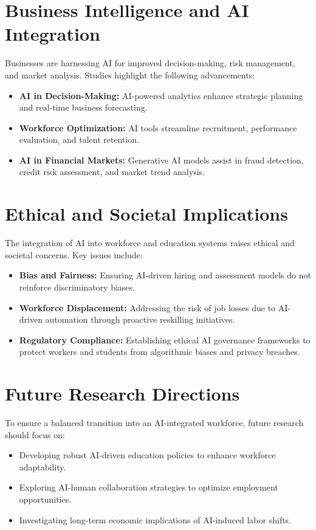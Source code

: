 \documentclass[a4paper,headinclude=on,footinclude=on,12pt,oneside]{scrbook}
\begin{document}
\section*{Business Intelligence and AI Integration}

Businesses are harnessing AI for improved decision-making, risk management, and market analysis. Studies highlight the following advancements:
\begin{itemize}
	\item \textbf{AI in Decision-Making:} AI-powered analytics enhance strategic planning and real-time business forecasting.
	\item \textbf{Workforce Optimization:} AI tools streamline recruitment, performance evaluation, and talent retention.
	\item \textbf{AI in Financial Markets:} Generative AI models assist in fraud detection, credit risk assessment, and market trend analysis.
\end{itemize}

\section{Ethical and Societal Implications}

The integration of AI into workforce and education systems raises ethical and societal concerns. Key issues include:
\begin{itemize}
	\item \textbf{Bias and Fairness:} Ensuring AI-driven hiring and assessment models do not reinforce discriminatory biases.
	\item \textbf{Workforce Displacement:} Addressing the risk of job losses due to AI-driven automation through proactive reskilling initiatives.
	\item \textbf{Regulatory Compliance:} Establishing ethical AI governance frameworks to protect workers and students from algorithmic biases and privacy breaches.
\end{itemize}

\section*{Future Research Directions}

To ensure a balanced transition into an AI-integrated workforce, future research should focus on:
\begin{itemize}
	\item Developing robust AI-driven education policies to enhance workforce adaptability.
	\item Exploring AI-human collaboration strategies to optimize employment opportunities.
	\item Investigating long-term economic implications of AI-induced labor shifts.
\end{itemize}
\end{document}
